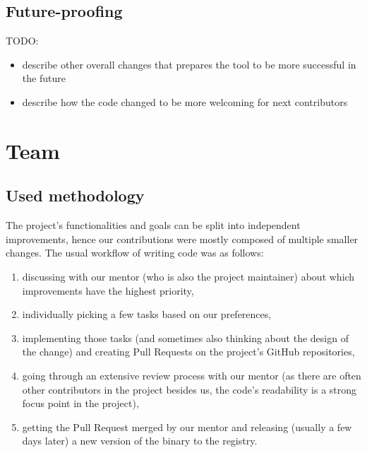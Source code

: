 \documentclass[licencjacka,en]{pracamgr}
\begin{document}
\section{Future-proofing}\label{r:section_future_proofing}

TODO:
\begin{itemize}
	\item describe other overall changes that prepares the tool to be more successful in the future
	\item describe how the code changed to be more welcoming for next contributors
\end{itemize}


\chapter{Team}\label{r:chapter_team}

\section{Used methodology}\label{r:section_used_methodology}

The project's functionalities and goals can be split into independent improvements, hence our
contributions were mostly composed of multiple smaller changes. The usual workflow of writing
code was as follows:
\begin{enumerate}
	\item discussing with our mentor (who is also the project maintainer) about which improvements
		have the highest priority,
	\item individually picking a few tasks based on our preferences,
	\item implementing those tasks (and sometimes also thinking about the design of the change)
		and creating Pull Requests on the project's GitHub repositories,
	\item going through an extensive review process with our mentor (as there are often other
		contributors in the project besides us, the code's readability is a strong focus point
		in the project),
	\item getting the Pull Request merged by our mentor and releasing (usually a few days later)
		a new version of the binary to the registry.
\end{enumerate}
\end{document}
